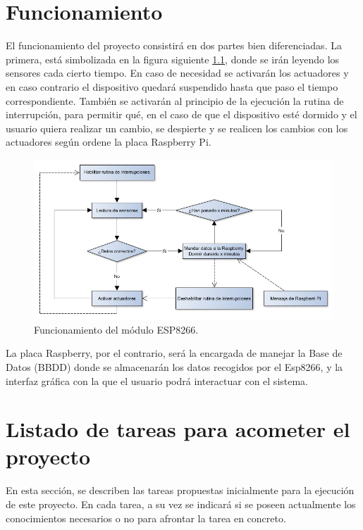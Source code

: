 \documentclass[12pt,a4paper,titlepage,oneside]{report}
\begin{document}
\chapter{Funcionamiento}

	El funcionamiento del proyecto consistirá en dos partes bien diferenciadas. La primera, está simbolizada en la figura siguiente \ref{Funcionamiento}, donde se irán leyendo los sensores cada cierto tiempo. En caso de necesidad se activarán los actuadores y en caso contrario el dispositivo quedará suspendido hasta que paso el tiempo correspondiente. También se activarán al principio de la ejecución la rutina de interrupción, para permitir qué, en el caso de que el dispositivo esté dormido y el usuario quiera realizar un cambio, se despierte y se realicen los cambios con los actuadores según ordene la placa Raspberry Pi.

	\begin{figure}[H]
		\center
		\includegraphics[scale=0.5]{./images/funcionamientoESP8266.jpg}
		\caption{Funcionamiento del módulo ESP8266.}
		\label{Funcionamiento}
	\end{figure}
	
	La placa Raspberry, por el contrario, será la encargada de manejar la Base de Datos (BBDD) donde se almacenarán los datos recogidos por el Esp8266, y la interfaz gráfica con la que el usuario podrá interactuar con el sistema.

\chapter{Listado de tareas para acometer el proyecto }

	En esta sección, se describen las tareas propuestas inicialmente para la ejecución de este proyecto. En cada tarea, a su vez se indicará si se poseen actualmente los conocimientos necesarios o no para afrontar la tarea en concreto.
	
\end{document}
